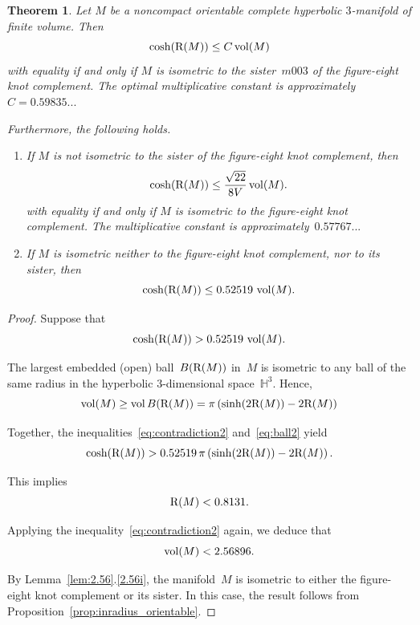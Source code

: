 \documentclass[11pt,reqno]{amsart}
\newtheorem{theorem}{Theorem}[section]
\theoremstyle{definition}
\numberwithin{equation}{section}
\newcommand{\HH}{{\mathbb H}}
\newcommand\RR{{\rm R}}
\DeclareMathOperator{\vol}{{\rm vol}}
\numberwithin{equation}{section}
\begin{document}
\begin{theorem} \label{theo:inradius_orientable}
Let $M$ be a noncompact orientable complete hyperbolic $3$-manifold of finite volume.
Then
\[
\cosh(\RR(M)) \leq C \vol(M)
\]
with equality if and only if $M$ is isometric to the sister~$m003$ of the figure-eight knot complement.
The optimal multiplicative constant is approximately~$C=0.59835...$

Furthermore, the following holds.
\begin{enumerate}
\item If $M$ is not isometric to the sister of the figure-eight knot complement, then
\[
\cosh(\RR(M)) \leq \frac{\sqrt{22}}{8V} \vol(M).
\]
with equality if and only if $M$ is isometric to the figure-eight knot complement.
The multiplicative constant is approximately~$0.57767...$
\item If $M$ is isometric neither to the figure-eight knot complement, nor to its sister, then 
\[
\cosh(\RR(M)) \leq 0.52519 \, \vol(M).
\]
\end{enumerate}
\end{theorem}


\begin{proof}
Suppose that 
\begin{equation} \label{eq:contradiction2}
\cosh(\RR(M)) > 0.52519 \, \vol(M).
\end{equation}

The largest embedded (open) ball~$B(\RR(M))$ in~$M$ is isometric to any ball of the same radius in the hyperbolic $3$-dimensional space~$\HH^3$.
Hence,
\begin{equation} \label{eq:ball2}
\vol(M) \geq \vol B(\RR(M)) = \pi \left( \sinh(2 \RR(M)) - 2 \RR(M) \right)
\end{equation}

Together, the inequalities~\eqref{eq:contradiction2} and~\eqref{eq:ball2} yield
\[
\cosh(\RR(M)) > 0.52519 \, \pi \left( \sinh(2 \RR(M)) - 2 \RR(M) \right).
\]

This implies
\begin{equation} \label{eq:sys<2}
\RR(M) < 0.8131.
\end{equation}

Applying the inequality~\eqref{eq:contradiction2} again, we deduce that
\begin{equation} \label{eq:vol<2}
\vol(M) < 2.56896.
\end{equation}

By Lemma~\ref{lem:2.56}.\eqref{2.56i}, the manifold~$M$ is isometric to either the figure-eight knot complement or its sister.
In this case, the result follows from Proposition~\ref{prop:inradius_orientable}.
\end{proof}
\end{document}
